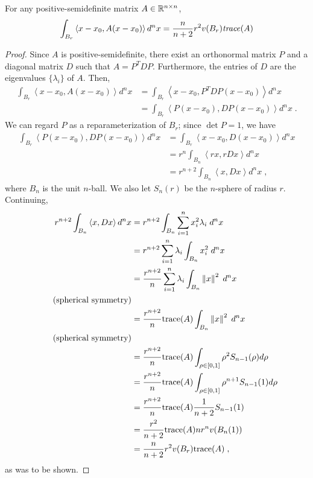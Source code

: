 	\begin{lm} For any positive-semidefinite matrix $A \in \mathbb{R}^{n\times n}$, 
		$$\int_{B_r} \left< x - x_0, A(x-x_0) \right> d^n x = \frac{n}{n+2} r^{2} v(B_r) \text{\emph{trace}} (A)$$
	\end{lm}
		
	\begin{proof}
		Since $A$ is positive-semidefinite, there exist an orthonormal matrix $P$ and a diagonal matrix $D$ such that $A = P^TDP$. Furthermore, the entries of $D$ are the eigenvalues $\{\lambda_i\}$ of $A$. Then, 
		\begin{align}
			\int_{B_r} \left< x - x_0, A(x-x_0) \right> d^n x &= \int_{B_r} \left< x - x_0, P^T DP(x-x_0) \right> d^n x\\
			&= \int_{B_r} \left< P(x - x_0),  DP(x-x_0) \right> d^n x \;.
		\end{align}
		We can regard $P$ as a reparameterization of $B_r$; since $\det P = 1$, we have 
		\begin{align}
			\int_{B_r} \left< P(x - x_0),  DP(x-x_0) \right> d^n x &= \int_{B_r} \left< x - x_0,  D(x-x_0) \right> d^n x \\
			&= r^n\int_{B_n} \left< rx, rDx \right> d^n x \\
			&= r^{n+2}\int_{B_n} \left< x, Dx \right> d^n x \;,
		\end{align}
		where $B_n$ is the unit $n$-ball. We also let $S_n(r)$ be the $n$-sphere of radius $r$. Continuing, 
		\begin{align}
			r^{n+2}\int_{B_n} \left< x, Dx \right> d^n x &= r^{n+2} \int_{B_n} \sum_{i= 1}^n x_i^2 \lambda_i \; d^nx \\
			&= r^{n+2} \sum_{i = 1}^n \lambda _i \int_{B_n} x_i^2 \; d^nx \\
			&= \frac{r^{n+2}}{n} \sum_{i = 1}^n \lambda _i \int_{B_n} \left\lVert x\right\rVert^2 \; d^nx \\ \tag{spherical symmetry} \\
			&= \frac{r^{n+2}}{n} \text{trace}(A)  \int_{B_n} \left\lVert x\right\rVert^2 \; d^nx \\ \tag{spherical symmetry} \\
			&= \frac{r^{n+2}}{n} \text{trace} (A) \int_{\rho \in [0,1]} \rho^2 S_{n-1}(\rho) d\rho \\
			&= \frac{r^{n+2}}{n} \text{trace} (A) \int_{\rho \in [0,1]} \rho^{n+1} S_{n-1}(1) d\rho \\
			&= \frac{r^{n+2}}{n} \text{trace} (A)  \frac{1}{n+2} S_{n-1}(1) \\
			&= \frac{r^2}{n+2}  \text{trace} (A)  n r^{n}v(B_n(1)) \\
			&= \frac{n}{n+2} r^{2} v(B_r) \text{trace} (A)\;,
		\end{align}
		as was to be shown. 
	\end{proof}

